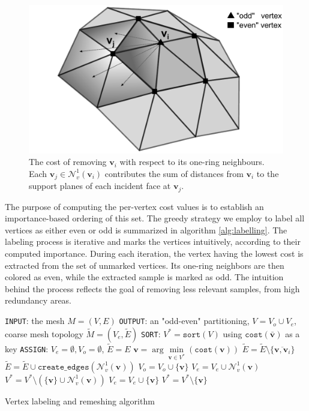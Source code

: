\documentclass[graybox]{svmult}
\begin{document}
\begin{figure}[!htbp]
	\centering
	\includegraphics[width=.9\linewidth]{oneRingCost.pdf}
	\caption{\label{fig_cds:oneRingCost}
		The cost of removing $\mathbf{v}_i$ with respect to its one-ring neighbours. Each $\mathbf{v}_j \in \mathcal{N}_v^1(\mathbf{v}_i)$ contributes
		the sum of distances from $\mathbf{v}_i$ to the support planes of each incident face at $\mathbf{v}_j$.}
\end{figure}

The purpose of computing the per-vertex cost values is to establish an importance-based ordering of this set. The greedy strategy we employ to label all vertices as either even or odd is summarized in algorithm \ref{alg:labelling}. The labeling process is iterative and marks the vertices intuitively, according to their computed importance. During each iteration, the vertex having the lowest cost is extracted from the set of unmarked vertices. Its one-ring neighbors are then colored as even, while the extracted sample is marked as odd. The intuition behind the process reflects the goal of removing less relevant samples, from high redundancy areas.
\begin{algorithm}
	\begin{algorithmic}
		\STATE \texttt{INPUT}: the mesh $M=(V,E)$
		\STATE \texttt{OUTPUT}: an "odd-even" partitioning, $V = {V_o} \cup {V_e}$, coarse mesh topology $\tilde{M}=(V_e,\tilde{E})$
		\STATE \texttt{SORT}: $V^{*} = \mathtt{sort}(V)$ using $\mathtt{cost}(\mathbf{\bar{v}})$ as a key
		\STATE \texttt{ASSIGN}: $V_e = \emptyset, V_o = \emptyset$, $\tilde{E} = E$
		\STATE $\mathbf{v} = \arg\min\limits_{\mathbf{v} \in V^{*}}(\mathtt{cost}(\mathbf{v}))$
		\STATE $\tilde{E} = \tilde{E} \setminus \{\overline{\mathbf{v}, \mathbf{v}_i}\}$
		\ENDFOR
		\STATE $\tilde{E} = \tilde{E} \cup \mathtt{create\_edges}(\mathcal{N}_v^1(\mathbf{v}))$
		\STATE $V_o = V_o \cup \{\mathbf{v}\}$
		\STATE $V_e = V_e \cup \mathcal{N}_v^1(\mathbf{v})$
		\STATE $V^{*} = V^{*} \setminus \left( \{ \mathbf{v} \} \cup \mathcal{N}_v^1(\mathbf{v}) \right)$
		\ELSE
		\STATE $V_e = V_e \cup \{\mathbf{v}\}$
		\STATE $V^{*} = V^{*} \setminus \{ \mathbf{v} \}$
		\ENDIF
		\ENDWHILE
	\end{algorithmic}
	\caption{Vertex labeling and remeshing algorithm}
	\label{alg:labelling}
\end{algorithm}
\end{document}
